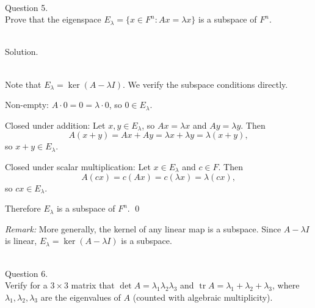 \documentclass{article}
\begin{document}
\newpage


\hfill \break  $~\!\!$ \dotfill \medskip \\
\textnormal{Question 5.}\\
Prove that the eigenspace $E_\lambda = \{x \in F^n : Ax = \lambda x\}$ is a subspace of $F^n$.

\noindent\\
\textnormal{Solution.}\\
\quad\\
\begin{mdframed}[linewidth=1pt]
Note that $E_\lambda = \ker(A - \lambda I)$. We verify the subspace conditions directly.

\medskip
\textnormal{Non-empty:} $A \cdot 0 = 0 = \lambda \cdot 0$, so $0 \in E_\lambda$.

\medskip
\textnormal{Closed under addition:} Let $x, y \in E_\lambda$, so $Ax = \lambda x$ and $Ay = \lambda y$. Then
\[
A(x + y) = Ax + Ay = \lambda x + \lambda y = \lambda(x + y),
\]
so $x + y \in E_\lambda$.

\medskip
\textnormal{Closed under scalar multiplication:} Let $x \in E_\lambda$ and $c \in F$. Then
\[
A(cx) = c(Ax) = c(\lambda x) = \lambda(cx),
\]
so $cx \in E_\lambda$.

\medskip
Therefore $E_\lambda$ is a subspace of $F^n$. \qed

\medskip
\textit{Remark:} More generally, the kernel of any linear map is a subspace. Since $A - \lambda I$ is linear, $E_\lambda = \ker(A - \lambda I)$ is a subspace.
\end{mdframed}

\newpage


\hfill \break  $~\!\!$ \dotfill \medskip \\
\textnormal{Question 6.}\\
Verify for a $3 \times 3$ matrix that $\det A = \lambda_1 \lambda_2 \lambda_3$ and $\operatorname{tr} A = \lambda_1 + \lambda_2 + \lambda_3$, where $\lambda_1, \lambda_2, \lambda_3$ are the eigenvalues of $A$ (counted with algebraic multiplicity).
\end{document}
